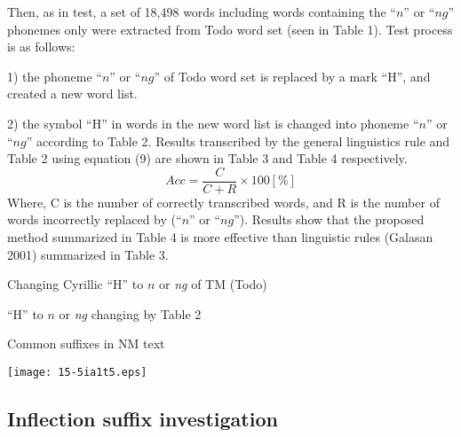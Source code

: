 \documentclass[english]{jnlp_1.4}
\begin{document}
Then, as in test, a set of 18,498 words including words containing the 
``$n$'' or ``$ng$'' phonemes only were extracted from Todo word set (seen in Table 
1). Test process is as follows:

1) the phoneme ``$n$'' or ``$ng$'' of Todo word set is replaced by a mark ``H'', 
and created a new word list.

2) the symbol ``H'' in words in the new word list is changed into phoneme 
``$n$'' or ``$ng$'' according to Table 2. Results transcribed by the general 
linguistics rule and Table 2 using equation (9) are shown in Table 3 and 
Table 4 respectively.
\begin{equation}
 Acc=\frac{C}{C+R} \times 100[\%]
\end{equation}
Where, C is the number of correctly transcribed words, and R is the number 
of words incorrectly replaced by (``$n$'' or ``$ng$''). Results show that the 
proposed method summarized in Table 4 is more effective than linguistic 
rules (Galasan 2001) summarized in Table 3.

\begin{table}[b]
\caption{Changing Cyrillic ``H'' to $n$ or \textit{ng} of TM (Todo)}
\begin{center}

\end{center}
\end{table}
\begin{table}[b]
\begin{minipage}[t]{0.5\textwidth}
\setlength{\captionwidth}{\linewidth}
\begin{center}

\end{center}
\end{minipage}
\hfill
\begin{minipage}[t]{0.45\textwidth}
\caption{``H'' to $n$ or \textit{ng} changing by Table 2}
\begin{center}

\end{center}
\end{minipage}
\end{table}
\begin{table}[b]
\caption{Common suffixes in NM text}
\begin{center}
\texttt{[image: 15-5ia1t5.eps]}
\end{center}
\end{table}



\subsection{Inflection suffix investigation}
\end{document}
